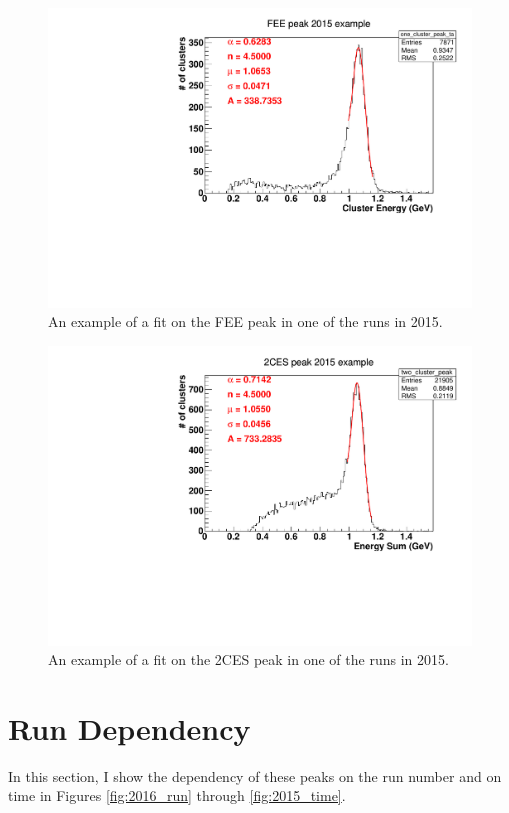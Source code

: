 \documentclass[11pt]{article}
\begin{document}
\begin{figure}[htbp] 
\begin{center}
\includegraphics[width =  .9\textwidth]{figures/one2015_fit_example.pdf}
\caption{An example of a fit on the FEE peak in one of the runs in 2015.} 
\label{fig:one2015_fit_example}
\end{center}
\end{figure}

\begin{figure}[htbp] 
\begin{center}
\includegraphics[width =  .9\textwidth]{figures/two2015_fit_example.pdf}
\caption{An example of a fit on the 2CES peak in one of the runs in 2015.} 
\label{fig:two2015_fit_example}
\end{center}
\end{figure}
\FloatBarrier
\section{Run Dependency}
In this section, I show the dependency of these peaks on the run number and on time in Figures \ref{fig:2016_run} through \ref{fig:2015_time}.  
\end{document}
